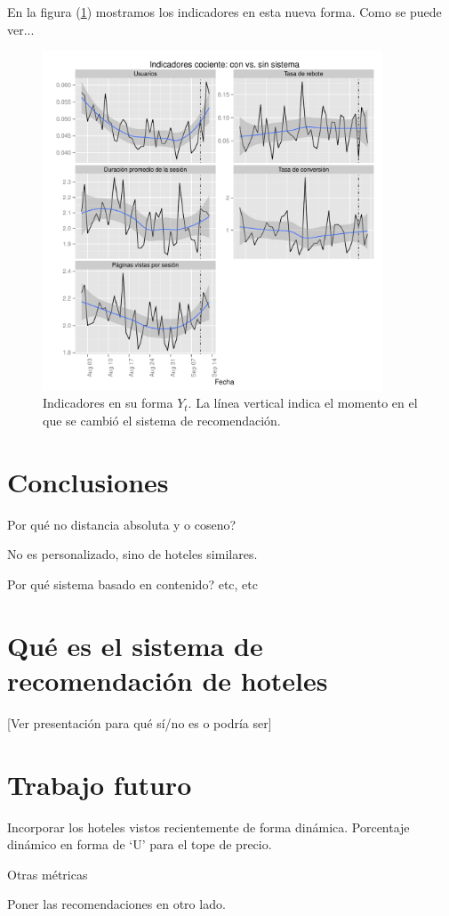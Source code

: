\documentclass[12pt]{report}
\begin{document}
En la figura (\ref{fig:analytics_y}) mostramos los indicadores en esta nueva forma. Como se puede ver...
\begin{figure}[ht]
	\centering
	\includegraphics[width=0.9\textwidth]{imagenes/analytics_y.pdf}
	\caption{\label{fig:analytics_y} Indicadores en su forma $Y_t$. La línea vertical indica el momento en el que se cambió el sistema de recomendación.}
\end{figure}



\section{Conclusiones}

Por qué no distancia absoluta y o coseno?

No es personalizado, sino de hoteles similares.

Por qué sistema basado en contenido? etc, etc

\section{Qué es el sistema de recomendación de hoteles}

[Ver presentación para qué sí/no es o podría ser]

\section{Trabajo futuro}
Incorporar los hoteles vistos recientemente de forma dinámica.
Porcentaje dinámico en forma de `U' para el tope de precio.

Otras métricas

Poner las recomendaciones en otro lado.












%
\end{document}

